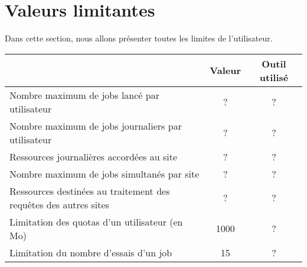 \section{Valeurs limitantes}

Dans cette section, nous allons présenter toutes les limites de l'utilisateur.


\begin{center}
	\begin{tabular}{| l | c | c |}
		\hline
		\rowcolor{lightgray} \multicolumn{1}{|c|}{Critère} & Valeur & Outil utilisé \\ \hline
		Nombre maximum de jobs lancé par utilisateur & ? & ? \\ \hline
		Nombre maximum de jobs journaliers par utilisateur & ? & ? \\ \hline
		Ressources journalières accordées au site & ? & ? \\ \hline
		Nombre maximum de jobs simultanés par site & ? & ? \\ \hline
		Ressources destinées au traitement des requêtes des autres sites & ? & ? \\ \hline
		Limitation des quotas d'un utilisateur (en Mo) & 1000 & ? \\ \hline
		Limitation du nombre d'essais d'un job & 15 & ? \\ \hline
	\end{tabular}
\end{center}
